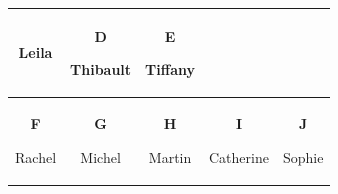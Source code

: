 \documentclass[12pt, a4paper]{article}
\begin{document}
\begin{minipage}{\textwidth}
\begin{table}[H]
\begin{tabulary}{\linewidth}{|C|C|C|C|C|}
					Leila
					&
					\textbf{D} \vspace{0.1cm}
					
					Thibault
					&
					\textbf{E} \vspace{0.1cm}
					
					Tiffany
					\\ \hline
					\textbf{F} \vspace{0.1cm}
					
					Rachel	
					&
					\textbf{G} \vspace{0.1cm}
					
					Michel	
					&
					\textbf{H} \vspace{0.1cm}
					
					Martin	
					&
					\textbf{I} \vspace{0.1cm}
					
					Catherine	
					&
					\textbf{J} \vspace{0.1cm}
					
					Sophie
					\\ \hline
				\end{tabulary}
			\end{table}

	\end{minipage}
		
\end{document}
